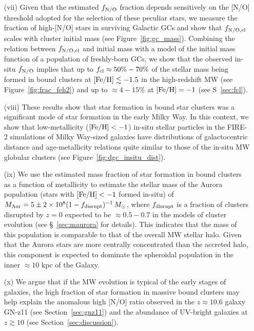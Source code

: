 \documentclass[a4paper,useAMS,usenatbib]{mnras}
\begin{document}
\begin{itemize}
    \item[(vii)] Given that the estimated $f_{\rm N/O}$ fraction depends sensitively on the [N/O] threshold adopted for the selection of these peculiar stars, we measure the fraction of high-[N/O] stars in surviving Galactic GCs and show that $f_{\rm N/O, cl}$ scales with cluster initial mass (see Figure~\ref{fig:gc_mass}). Combining the relation between $f_{\rm N/O, cl}$ and initial mass with a model of the initial mass function of a population of freshly-born GCs, we show that the observed in-situ $f_{\rm N/O}$ implies that up to $f_{\rm cl}\approx 50\%-70\%$ of the stellar mass being formed in bound clusters at $\rm [Fe/H]\lesssim -1.5$ in the high-redshift MW (see Figure~\ref{fig:frac_feh2}) and up to $\approx 4-15\%$ at $\rm [Fe/H]=-1$ (see S~\ref{sec:fcl}).\\

    \item[(viii)] These results show that star formation in bound star clusters was a significant mode of star formation in the early Milky Way. In this context, we show that low-metallicity ($\rm [Fe/H]<-1$) in-situ stellar particles in the FIRE-2 simulations of Milky Way-sized galaxies have distributions of galactocentric distance and age-metallicity relations quite similar to those of the in-situ MW globular clusters (see Figure~\ref{fig:dgc_insitu_dist}).\\

    \item[(ix)] We use the estimated mass fraction of star formation in bound clusters as a function of metallicity to estimate the stellar mass of the Aurora population (stars with $[\rm Fe/H]<-1$ formed in-situ) of  $M_{\rm Aur} = 5\pm 2 \times 10^8 (1-f_{\rm disrupt})^{-1}\, M_\odot$, where $f_{\rm disrupt}$ is a fraction of clusters disrupted by $z=0$ expected to be $\approx 0.5-0.7$ in the models of cluster evolution (see \S~\ref{sec:maurora} for details). This indicates that the mass of this population is comparable to that of the overall MW stellar halo. Given that the Aurora stars are more centrally concentrated than the accreted halo, this component is expected to dominate the spheroidal population in the inner $\approx 10$ kpc of the Galaxy. \\

    \item[(x)] We argue that if the MW evolution is typical of the early stages of galaxies, the high fraction of star formation in massive bound clusters may help explain the anomalous high [N/O] ratio observed in the $z\approx 10.6$ galaxy GN-z11 (see Section~\ref{sec:gnz11}) and the abundance of UV-bright galaxies at $z\gtrsim 10$ (see Section~\ref{sec:discussion}). 


\end{itemize}
\end{document}
